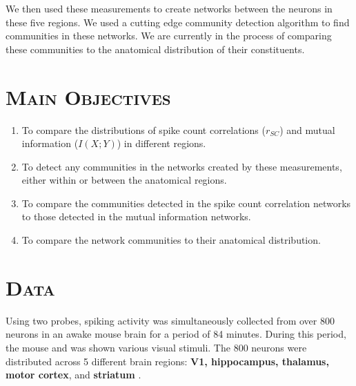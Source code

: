 \documentclass[a0,portrait]{a0poster}
\begin{document}
\begin{multicols}{2}
We then used these measurements to create networks between the neurons in these five regions. We used a cutting edge community detection algorithm to find communities in these networks. We are currently in the process of comparing these communities to the anatomical distribution of their constituents.



\section*{\color{NavyBlue}\textsc{Main Objectives}\color{NavyBlue}}

\begin{enumerate}
  \item To compare the distributions of spike count correlations ($r_{SC}$) and mutual information ($I(X;Y)$) in different regions.
  \item To detect any communities in the networks created by these measurements, either within or between the anatomical regions.
  \item To compare the communities detected in the spike count correlation networks to those detected in the mutual information networks.
  \item To compare the network communities to their anatomical distribution.
\end{enumerate}


\section*{\color{NavyBlue}\textsc{Data}\color{NavyBlue}}

Using two probes, spiking activity was simultaneously collected from over 800 neurons in an awake mouse brain for a period of 84 minutes. During this period, the mouse and was shown various visual stimuli. The 800 neurons were distributed across 5 different brain regions: \textbf{V1, hippocampus, thalamus, motor cortex}, and \textbf{striatum} \cite{jun}.


\end{multicols}
\end{document}
